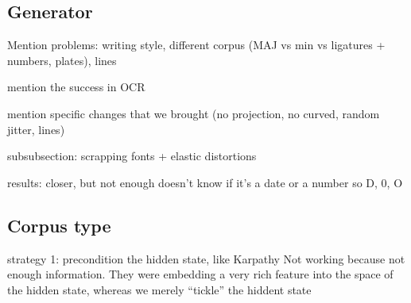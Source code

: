 
	\subsection{Generator}




		Mention problems: writing style, different corpus (MAJ vs min vs ligatures + numbers, plates), lines

		mention the success in OCR

		mention specific changes that we brought (no projection, no curved, random jitter, lines)

		subsubsection: scrapping fonts + elastic distortions

		results:  closer, but not enough doesn't know if it's a date or a number so D, 0, O



	\subsection{Corpus type}
		strategy 1: precondition the hidden state, like Karpathy
		Not working because not enough information. They were embedding a very rich feature into the space of the hidden state, whereas we merely ``tickle'' the hiddent state

